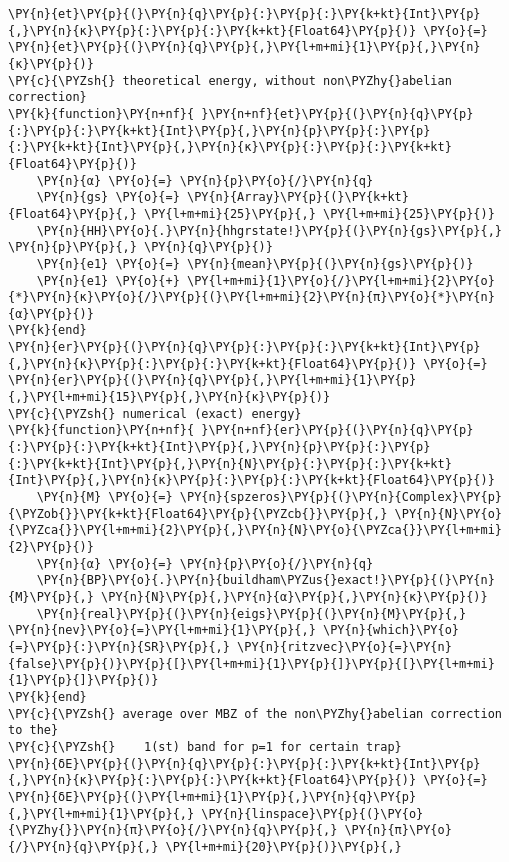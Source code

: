 \begin{Verbatim}[commandchars=\\\{\}]
\PY{n}{et}\PY{p}{(}\PY{n}{q}\PY{p}{:}\PY{p}{:}\PY{k+kt}{Int}\PY{p}{,}\PY{n}{κ}\PY{p}{:}\PY{p}{:}\PY{k+kt}{Float64}\PY{p}{)} \PY{o}{=}  \PY{n}{et}\PY{p}{(}\PY{n}{q}\PY{p}{,}\PY{l+m+mi}{1}\PY{p}{,}\PY{n}{κ}\PY{p}{)}
\PY{c}{\PYZsh{} theoretical energy, without non\PYZhy{}abelian correction}
\PY{k}{function}\PY{n+nf}{ }\PY{n+nf}{et}\PY{p}{(}\PY{n}{q}\PY{p}{:}\PY{p}{:}\PY{k+kt}{Int}\PY{p}{,}\PY{n}{p}\PY{p}{:}\PY{p}{:}\PY{k+kt}{Int}\PY{p}{,}\PY{n}{κ}\PY{p}{:}\PY{p}{:}\PY{k+kt}{Float64}\PY{p}{)}
    \PY{n}{α} \PY{o}{=} \PY{n}{p}\PY{o}{/}\PY{n}{q}
    \PY{n}{gs} \PY{o}{=} \PY{n}{Array}\PY{p}{(}\PY{k+kt}{Float64}\PY{p}{,} \PY{l+m+mi}{25}\PY{p}{,} \PY{l+m+mi}{25}\PY{p}{)}
    \PY{n}{HH}\PY{o}{.}\PY{n}{hhgrstate!}\PY{p}{(}\PY{n}{gs}\PY{p}{,} \PY{n}{p}\PY{p}{,} \PY{n}{q}\PY{p}{)}
    \PY{n}{e1} \PY{o}{=} \PY{n}{mean}\PY{p}{(}\PY{n}{gs}\PY{p}{)}
    \PY{n}{e1} \PY{o}{+} \PY{l+m+mi}{1}\PY{o}{/}\PY{l+m+mi}{2}\PY{o}{*}\PY{n}{κ}\PY{o}{/}\PY{p}{(}\PY{l+m+mi}{2}\PY{n}{π}\PY{o}{*}\PY{n}{α}\PY{p}{)}
\PY{k}{end}
\PY{n}{er}\PY{p}{(}\PY{n}{q}\PY{p}{:}\PY{p}{:}\PY{k+kt}{Int}\PY{p}{,}\PY{n}{κ}\PY{p}{:}\PY{p}{:}\PY{k+kt}{Float64}\PY{p}{)} \PY{o}{=} \PY{n}{er}\PY{p}{(}\PY{n}{q}\PY{p}{,}\PY{l+m+mi}{1}\PY{p}{,}\PY{l+m+mi}{15}\PY{p}{,}\PY{n}{κ}\PY{p}{)}
\PY{c}{\PYZsh{} numerical (exact) energy}
\PY{k}{function}\PY{n+nf}{ }\PY{n+nf}{er}\PY{p}{(}\PY{n}{q}\PY{p}{:}\PY{p}{:}\PY{k+kt}{Int}\PY{p}{,}\PY{n}{p}\PY{p}{:}\PY{p}{:}\PY{k+kt}{Int}\PY{p}{,}\PY{n}{N}\PY{p}{:}\PY{p}{:}\PY{k+kt}{Int}\PY{p}{,}\PY{n}{κ}\PY{p}{:}\PY{p}{:}\PY{k+kt}{Float64}\PY{p}{)}
    \PY{n}{M} \PY{o}{=} \PY{n}{spzeros}\PY{p}{(}\PY{n}{Complex}\PY{p}{\PYZob{}}\PY{k+kt}{Float64}\PY{p}{\PYZcb{}}\PY{p}{,} \PY{n}{N}\PY{o}{\PYZca{}}\PY{l+m+mi}{2}\PY{p}{,}\PY{n}{N}\PY{o}{\PYZca{}}\PY{l+m+mi}{2}\PY{p}{)}
    \PY{n}{α} \PY{o}{=} \PY{n}{p}\PY{o}{/}\PY{n}{q}
    \PY{n}{BP}\PY{o}{.}\PY{n}{buildham\PYZus{}exact!}\PY{p}{(}\PY{n}{M}\PY{p}{,} \PY{n}{N}\PY{p}{,}\PY{n}{α}\PY{p}{,}\PY{n}{κ}\PY{p}{)}
    \PY{n}{real}\PY{p}{(}\PY{n}{eigs}\PY{p}{(}\PY{n}{M}\PY{p}{,} \PY{n}{nev}\PY{o}{=}\PY{l+m+mi}{1}\PY{p}{,} \PY{n}{which}\PY{o}{=}\PY{p}{:}\PY{n}{SR}\PY{p}{,} \PY{n}{ritzvec}\PY{o}{=}\PY{n}{false}\PY{p}{)}\PY{p}{[}\PY{l+m+mi}{1}\PY{p}{]}\PY{p}{[}\PY{l+m+mi}{1}\PY{p}{]}\PY{p}{)}
\PY{k}{end}
\PY{c}{\PYZsh{} average over MBZ of the non\PYZhy{}abelian correction to the}
\PY{c}{\PYZsh{}    1(st) band for p=1 for certain trap}
\PY{n}{δE}\PY{p}{(}\PY{n}{q}\PY{p}{:}\PY{p}{:}\PY{k+kt}{Int}\PY{p}{,}\PY{n}{κ}\PY{p}{:}\PY{p}{:}\PY{k+kt}{Float64}\PY{p}{)} \PY{o}{=} \PY{n}{δE}\PY{p}{(}\PY{l+m+mi}{1}\PY{p}{,}\PY{n}{q}\PY{p}{,}\PY{l+m+mi}{1}\PY{p}{,} \PY{n}{linspace}\PY{p}{(}\PY{o}{\PYZhy{}}\PY{n}{π}\PY{o}{/}\PY{n}{q}\PY{p}{,} \PY{n}{π}\PY{o}{/}\PY{n}{q}\PY{p}{,} \PY{l+m+mi}{20}\PY{p}{)}\PY{p}{,}

\end{Verbatim}
